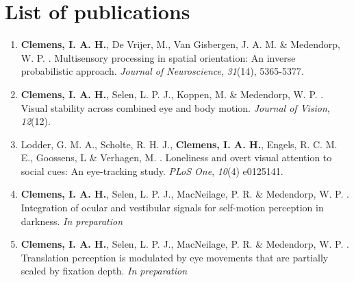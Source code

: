 \clearpage
\pagestyle{empty}

\chapter*{List of publications}
{}

\begin{enumerate}

\item \textbf{Clemens, I. A. H.}, De Vrijer, M., Van Gisbergen, J. A. M. \& Medendorp, W. P.
\citeyear{clemens2011}. Multisensory processing in spatial orientation: An inverse probabilistic approach. \textit{Journal of Neuroscience}, \textit{31}(14), 5365-5377.

\item \textbf{Clemens, I. A. H.}, Selen, L. P. J., Koppen, M. \& Medendorp, W. P. \citeyear{clemens2012}. Visual stability across combined eye and body motion. \textit{Journal of Vision}, \textit{12}(12).

\item Lodder, G. M. A., Scholte, R. H. J., \textbf{Clemens, I. A. H.}, Engels, R. C. M. E., Goossens, L \& Verhagen, M. \citeyear{lodder2015}. Loneliness and overt visual attention to social cues: An eye-tracking study. \textit{PLoS One}, \textit{10}(4) e0125141.

\item \textbf{Clemens, I. A. H.}, Selen, L. P. J., MacNeilage, P. R. \& Medendorp, W. P. \citeyear{clemens2015a}. Integration of ocular and vestibular signals for self-motion perception in darkness. \textit{In preparation}

\item \textbf{Clemens, I. A. H.}, Selen, L. P. J., MacNeilage, P. R. \& Medendorp, W. P. \citeyear{clemens2015b}. Translation perception is modulated by eye movements that are partially scaled by fixation depth. \textit{In preparation}

\end{enumerate}
